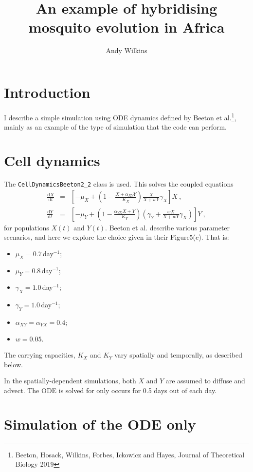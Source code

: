 \documentclass{article}
\title{An example of hybridising mosquito evolution in Africa}
\author{Andy Wilkins}
\begin{document}
\maketitle

\section{Introduction}

I describe a simple simulation using ODE dynamics defined by Beeton et al.\footnote{Beeton, Hosack, Wilkins, Forbes, Ickowicz and Hayes, Journal of Theoretical Biology 2019}, mainly as an example of the type of simulation that the code can perform.

\section{Cell dynamics}

The {\tt CellDynamicsBeeton2\_2} class is used.  This solves the coupled equations
\begin{eqnarray}
  \frac{{\mathrm d}X}{{\mathrm d}t} & = & \left[-\mu_{X} + \left(1 - \frac{X + \alpha_{XY}Y}{K_{X}}\right)\frac{X}{X + wY}\gamma_{X}\right] X \ , \\
  \frac{{\mathrm d}Y}{{\mathrm d}t} & = & \left[-\mu_{Y} + \left(1 - \frac{\alpha_{YX}X + Y}{K_{Y}}\right)\left( \gamma_{Y} + \frac{wX}{X + wY}\gamma_{X}\right) \right] Y \ ,
\end{eqnarray}
for populations $X(t)$ and $Y(t)$.  Beeton et al. describe various parameter scenarios, and here we explore the choice given in their Figure5(c).  That is:
\begin{itemize}
\item $\mu_{X} = 0.7$\,day$^{-1}$;
\item $\mu_{Y} = 0.8$\,day$^{-1}$;
\item $\gamma_{X} = 1.0$\,day$^{-1}$;
\item $\gamma_{Y} = 1.0$\,day$^{-1}$;
\item $\alpha_{XY} = \alpha_{YX} = 0.4$;
\item $w=0.05$.
\end{itemize}
The carrying capacities, $K_{X}$ and $K_{Y}$ vary spatially and temporally, as described below.

In the spatially-dependent simulations, both $X$ and $Y$ are assumed to diffuse and advect.  The ODE is solved for only occurs for 0.5 days out of each day.

\section{Simulation of the ODE only}
\label{sec.ode.only}
\end{document}
